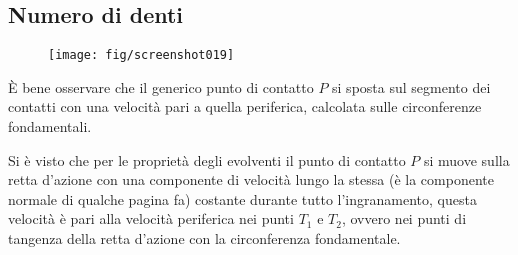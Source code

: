 \documentclass[a4paper, 15pt]{article}
\begin{document}
\subsection{Numero di denti}
	 \begin{figure}[H]
	 	\centering
	 	\texttt{[image: fig/screenshot019]}
	 	\label{fig:screenshot019_bis}
	 \end{figure} 
	 
\begin{adjustwidth}{2in}{}
	 È bene osservare che il generico punto di contatto $P$ si sposta sul segmento dei contatti con una velocità pari a quella periferica, calcolata sulle circonferenze fondamentali.\newline 
	 	 
	 Si è visto che per le proprietà degli evolventi il punto di contatto $P$ si muove sulla retta d'azione con una componente di velocità lungo la stessa (è la componente normale di qualche pagina fa) costante durante tutto l'ingranamento, questa velocità è pari alla velocità periferica nei punti $T_1$ e $T_2$, ovvero nei punti di tangenza della retta d'azione con la circonferenza fondamentale.
	 

\end{adjustwidth}
\end{document}

